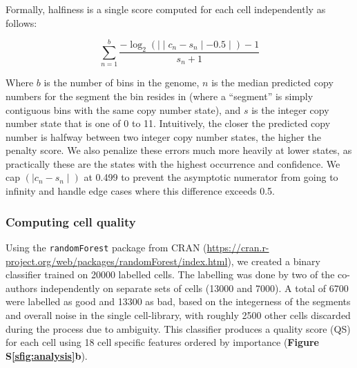 \documentclass{article}
\newcommand{\refsupfig}[2][]{\textbf{Figure S}\textbf{\ref{#2}}{#1}}
\begin{document}
Formally, halfiness is a single score computed for each cell independently as follows:

\begin{equation}
    \sum_{n = 1}^{b}{\frac{-\log_{2}(\mid\mid c_{n} - s_{n} \mid - 0.5\mid) - 1}{s_{n} + 1}}
\end{equation}

Where $b$ is the number of bins in the genome, $n$ is the median predicted copy numbers for the segment the bin resides in (where a ``segment'' is simply contiguous bins with the same copy number state), and $s$ is the integer copy number state that is one of 0 to 11. Intuitively, the closer the predicted copy number is halfway between two integer copy number states, the higher the penalty score. We also penalize these errors much more heavily at lower states, as practically these are the states with the highest occurrence and confidence. We cap $(\mid c_{n} - s_{n} \mid)$ at 0.499 to prevent the asymptotic numerator from going to infinity and handle edge cases where this difference exceeds 0.5.

\subsubsection*{Computing cell quality}

Using the \texttt{randomForest} package from CRAN (\url{https://cran.r-project.org/web/packages/randomForest/index.html}), we created a binary classifier trained on 20000 labelled cells. The labelling was done by two of the co-authors independently on separate sets of cells (13000 and 7000). A total of 6700 were labelled as good and 13300 as bad, based on the integerness of the segments and overall noise in the single cell-library, with roughly 2500 other cells discarded during the process due to ambiguity. This classifier produces a quality score (QS) for each cell using 18 cell specific features ordered by importance (\refsupfig{sfig:analysis}\textbf{b}).
\end{document}
